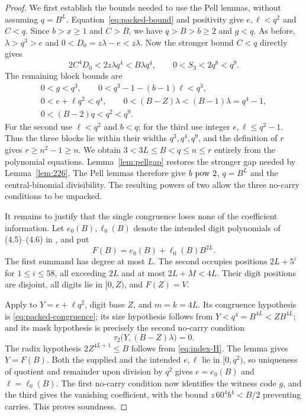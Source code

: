 \begin{proof}
We first establish the bounds needed to use the Pell lemmas, without
assuming $q=B^L$. Equation~\eqref{eq:packed-bound} and positivity give
$e,\ell<q^2$ and $C<q$. Since $b>x\ge1$ and $C>B$, we have
$q>B>b\ge2$ and $g<q$. As before,
$\lambda>q^3>e$ and $0<D_0=z\lambda-e<z\lambda$. Now the stronger
bound $C<q$ directly gives
\[
 2C^4D_0<2z\lambda q^4<B\lambda q^4,
 \qquad 0<S_3<2q^8<q^9.
\]
The remaining block bounds are
\begin{gather*}
 0<g<q^3,\qquad
 0<q^3-1-(b-1)\ell<q^3,\\
 0<e+\ell q^2<q^4,\qquad
 0<(B-Z)\lambda<(B-1)\lambda=q^4-1,\\
 0<(B-2)q<q^2<q^9.
\end{gather*}
For the second use $\ell<q^2$ and $b<q$; for the third use integer
$e,\ell\le q^2-1$. Thus the three blocks lie within their widths
$q^3,q^4,q^9$, and the definition of $r$ gives $r\ge n^2-1\ge n$.
We obtain $3<3L\le B<q\le n\le r$ entirely from the polynomial
equations. Lemma~\ref{lem:pellgap} restores the stronger gap needed by
Lemma~\ref{lem:226}. The Pell lemmas therefore give $b\ \mathrm{pow}\ 2$,
$q=B^L$ and the central-binomial divisibility. The resulting powers of
two allow the three no-carry conditions to be unpacked.

It remains to justify that the single congruence loses none of the
coefficient information. Let $e_0(B),\ell_0(B)$ denote the intended
digit polynomials of (4.5)--(4.6) in \cite{J82}, and put
\[
 F(B)=e_0(B)+\ell_0(B)B^{2L}.
\]
The first summand has degree at most $L$. The second occupies positions
$2L+5^i$ for $1\le i\le58$, all exceeding $2L$ and at most
$2L+M<4L$. Their digit positions are disjoint, all digits lie in
$[0,Z)$, and $F(Z)=V$.

Apply \cite[Lemma~2.9]{J82} to $Y=e+\ell q^2$, digit base $Z$, and
$m=k=4L$. Its congruence hypothesis is
\eqref{eq:packed-congruence}; its size hypothesis follows from
$Y<q^4=B^{4L}<ZB^{4L}$; and its mask hypothesis is precisely the second
no-carry condition
\[
 \tau_2\bigl(Y,(B-Z)\lambda\bigr)=0.
\]
The radix hypothesis $2Z^{4L+1}\le B$ follows from
\eqref{eq:index-H}. The lemma gives $Y=F(B)$. Both the supplied and
the intended $e,\ell$ lie in $[0,q^2)$, so uniqueness of quotient and
remainder upon division by $q^2$ gives $e=e_0(B)$ and
$\ell=\ell_0(B)$. The first no-carry condition now identifies the
witness code $g$, and the third gives the vanishing coefficient, with
the bound $z\,60^4b^4<B/2$ preventing carries. This proves soundness.


\end{proof}
